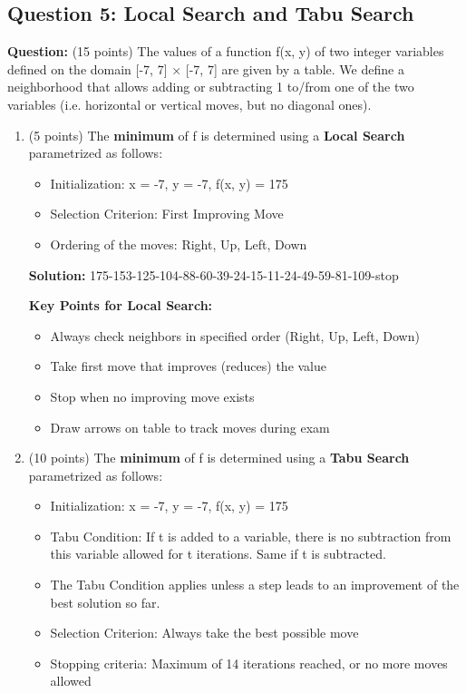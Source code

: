 \subsection{Question 5: Local Search and Tabu Search}
\textbf{Question:} (15 points) The values of a function f(x, y) of two integer variables defined on the domain [-7, 7] × [-7, 7] are given by a table. We define a neighborhood that allows adding or subtracting 1 to/from one of the two variables (i.e. horizontal or vertical moves, but no diagonal ones).

\begin{enumerate}[label=\alph*)]
\item (5 points) The \textbf{minimum} of f is determined using a \textbf{Local Search} parametrized as follows:
\begin{itemize}
\item Initialization: x = -7, y = -7, f(x, y) = 175
\item Selection Criterion: First Improving Move
\item Ordering of the moves: Right, Up, Left, Down
\end{itemize}

\textbf{Solution:} 175-153-125-104-88-60-39-24-15-11-24-49-59-81-109-stop

\textbf{Key Points for Local Search:}
\begin{itemize}
\item Always check neighbors in specified order (Right, Up, Left, Down)
\item Take first move that improves (reduces) the value
\item Stop when no improving move exists
\item Draw arrows on table to track moves during exam
\end{itemize}

\item (10 points) The \textbf{minimum} of f is determined using a \textbf{Tabu Search} parametrized as follows:
\begin{itemize}
\item Initialization: x = -7, y = -7, f(x, y) = 175
\item Tabu Condition: If t is added to a variable, there is no subtraction from this variable allowed for t iterations. Same if t is subtracted.
\item The Tabu Condition applies unless a step leads to an improvement of the best solution so far.
\item Selection Criterion: Always take the best possible move
\item Stopping criteria: Maximum of 14 iterations reached, or no more moves allowed
\end{itemize}


\end{enumerate}
